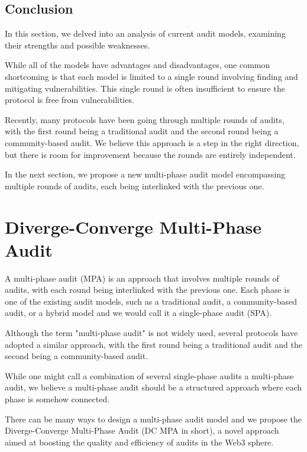 \documentclass[10pt]{extarticle}
\begin{document}
\subsection{ Conclusion}\label{34-conclusion}

In this section, we delved into an analysis of current audit models,
examining their strengths and possible weaknesses.

While all of the models have advantages and disadvantages, one common
shortcoming is that each model is limited to a single round involving
finding and mitigating vulnerabilities. This single round is often
insufficient to ensure the protocol is free from vulnerabilities.

Recently, many protocols have been going through multiple rounds of
audits, with the first round being a traditional audit and the second
round being a community-based audit. We believe this approach is a step
in the right direction, but there is room for improvement because the
rounds are entirely independent.

In the next section, we propose a new multi-phase audit model
encompassing multiple rounds of audits, each being interlinked with the
previous one.

\section{ Diverge-Converge Multi-Phase
Audit}\label{4-diverge-converge-multi-phase-audit}

A multi-phase audit (MPA) is an approach that involves multiple rounds
of audits, with each round being interlinked with the previous one. Each
phase is one of the existing audit models, such as a traditional audit,
a community-based audit, or a hybrid model and we would call it a
single-phase audit (SPA).

Although the term "multi-phase audit" is not widely used, several
protocols have adopted a similar approach, with the first round being a
traditional audit and the second being a community-based audit.

While one might call a combination of several single-phase audits a
multi-phase audit, we believe a multi-phase audit should be a structured
approach where each phase is somehow connected.

There can be many ways to design a multi-phase audit model and we
propose the Diverge-Converge Multi-Phase Audit (DC MPA in short), a
novel approach aimed at boosting the quality and efficiency of audits in
the Web3 sphere.
\end{document}
